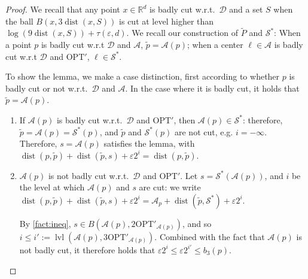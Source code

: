 \documentclass[11pt]{article}
\newcommand{\R}{\mathbb R}
\newcommand{\opt}{\text{OPT}}
\newcommand{\eps}{\varepsilon}
\renewcommand{\tilde}{\widetilde}
\newcommand{\calD}{\mathcal {D}}
\newcommand{\calS}{\mathcal {S}}
\newcommand{\calL}{\mathcal{A}}
\newcommand{\offset}{\tau(\eps, d)}
\DeclareMathOperator{\dist}{dist}
\newcommand{\lpar}{\left(}
\newcommand{\rpar}{\right)}
\DeclareMathOperator{\level}{lvl}
\begin{document}
\begin{proof}
We recall that any point $x \in \R^d$ is badly cut w.r.t.\ $\calD$ and a set $S$ when the ball $B(x, 3\dist(x, S))$ is cut at level higher than $\log(9 \dist(x, S)) + \offset$. 
We recall our construction of $\tilde P$ and $\calS^*$: When a point $p$ is badly cut w.r.t $\calD$ and $\calL$, $\tilde p = \calL(p)$; when a center $\ell \in \calL$ is badly cut  w.r.t $\calD$ and $\opt'$, $\ell \in \calS^*$. 


To show the lemma, we make a case distinction, first according to whether $p$ is badly cut or not w.r.t.~$\calD$ and $\calL$. 
In the case where it is badly cut, it holds that $\tilde p = \calL(p)$.

\begin{enumerate}
 \item If $\calL(p)$ is badly cut w.r.t.\ $\calD$ and $\opt'$, then $\calL(p) \in \calS^*$: therefore, 
$\tilde p = \calL(p) =  \calS^*(p)$, and $\tilde p$ and $ \calS^*(p)$ are not cut, e.g. $i=-\infty$. Therefore, $s = \calL(p)$ satisfies the lemma, with $\dist(p, \tilde p) + \dist(\tilde p, s) + \eps 2^i = \dist(p, \tilde p)$. 
 \item $\calL(p)$ is not badly cut w.r.t.\ $\calD$ and $\opt'$. Let $s = \calS^*(\calL(p))$, and $i$ be the level at which $\calL(p)$ and $s$ are cut: we write 
 $\dist(p, \tilde p) + \dist(\tilde p, s) + \eps 2^i = \calL_p + \dist(\tilde p, \calS^*) + \eps 2^{i}$. 
 
 By \cref{fact:ineq}, $s \in B(\calL(p), 2\opt'_{\calL(p)})$, and so
  $i \leq i' := \level\lpar \calL(p),  3\opt'_{\calL(p)}\rpar$. 
 Combined with the fact that $\calL(p)$ is not badly cut,  it therefore holds that 
 $\eps 2^{i} \leq \eps 2^{i'} \leq b_3(p)$. 
  \end{enumerate}
 

\end{proof}
\end{document}
